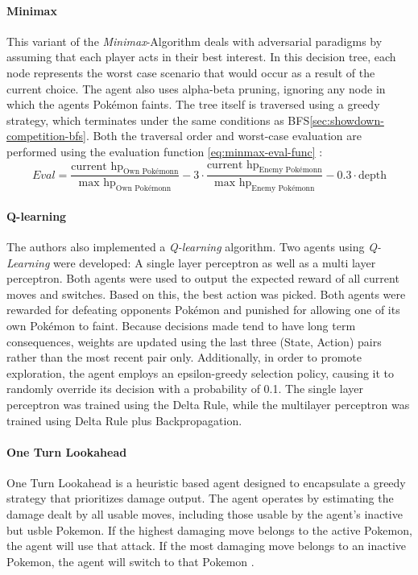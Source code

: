 \paragraph{Minimax}
This variant of the \textit{Minimax}-Algorithm deals with adversarial paradigms by assuming
that each player acts in their best interest. In this decision tree, each node represents
the worst case scenario that would occur as a result of the current choice. The agent
also uses alpha-beta pruning, ignoring any node in which the agents Pokémon faints. 
The tree itself is traversed using a greedy strategy, which terminates under the same 
conditions as \ac{BFS}\ref{sec:showdown-competition-bfs}. Both the traversal order and 
worst-case evaluation are performed using the evaluation function \ref{eq:minmax-eval-func}
\cite{Lee_Togelius_2017}:
\begin{equation}
\label{eq:minmax-eval-func}
    Eval = \frac{\text{current hp}_{\text{Own Pokémonn}}}{\text{max hp}_{\text{Own Pokémonn}}} -
    3 \cdot \frac{\text{current hp}_{\text{Enemy Pokémonn}}}{\text{max hp}_{\text{Enemy Pokémonn}}} -
    0.3 \cdot \text{depth}
\end{equation}

\paragraph{Q-learning}
The authors also implemented a \textit{Q-learning} algorithm. Two agents using \textit{Q-Learning}
were developed: A single layer perceptron as well as a multi layer perceptron. Both agents were 
used to output the expected reward of all current moves and switches. Based on this, the best 
action was picked. Both agents were rewarded for defeating opponents Pokémon and punished for 
allowing one of its own Pokémon to faint. Because decisions made tend to have long term consequences, 
weights are updated using the last three (State, Action) pairs rather than the most recent pair only.
Additionally, in order to promote exploration, the agent employs an epsilon-greedy selection policy, 
causing it to randomly override its decision with a probability of 0.1. The single layer perceptron 
was trained using the Delta Rule, while the multilayer perceptron was trained using Delta Rule 
plus Backpropagation\cite{Lee_Togelius_2017}.

\paragraph{One Turn Lookahead}
One Turn Lookahead is a heuristic based agent designed to encapsulate a greedy strategy that 
prioritizes damage output. The agent operates by estimating the damage dealt by all usable moves, 
including those usable by the agent's inactive but usble Pokemon. If the highest damaging move 
belongs to the active Pokemon, the agent will use that attack. If the most damaging move belongs to 
an inactive Pokemon, the agent will switch to that Pokemon \cite{Lee_Togelius_2017}.

